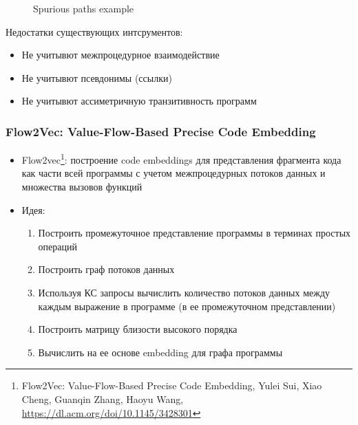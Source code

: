 \documentclass[xcolor=table,english]{beamer}
\begin{document}
\begin{frame}[fragile]
\begin{minipage}[m]{\linewidth}
\begin{figure}
            \caption{Spurious paths example}
        \end{figure}
    \end{minipage}\hfill
    \begin{minipage}[m]{\linewidth}
        Недостатки существующих интсрументов:
        \begin{itemize}
            \item Не учитывют межпроцедурное взаимодействие
            \item Не учитывют псевдонимы (ссылки)
            \item Не учитывют ассиметричную транзитивность программ
        \end{itemize}
    \end{minipage}
\end{frame}

\begin{frame}[fragile] \frametitle{Flow2Vec: Value-Flow-Based Precise Code Embedding}
    \begin{itemize}
            \item Flow2vec\footnote{Flow2Vec: Value-Flow-Based Precise Code Embedding, Yulei Sui, Xiao Cheng, Guanqin Zhang, Haoyu Wang, \href{https://dl.acm.org/doi/10.1145/3428301}{https://dl.acm.org/doi/10.1145/3428301}}: построение code embeddings для представления фрагмента кода как части всей программы с учетом межпроцедурных потоков данных и множества вызовов функций
            \item Идея:
            {
                \begin{enumerate}
                    \item Построить промежуточное представление программы в терминах простых операций
                    \item Построить граф потоков данных
                    \item Используя КС запросы вычислить количество потоков данных между каждым выражение в программе (в ее промежуточном представлении)
                    \item Построить матрицу близости высокого порядка
                    \item Вычислить на ее основе embedding для графа программы
                \end{enumerate}
            }
        \end{itemize}
\end{frame}
\end{document}

